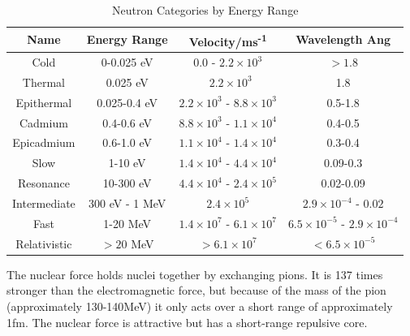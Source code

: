 \begin{table}[h]
\begin{center}
\renewcommand{\arraystretch}{1.2}
\begin{tabular}{c c c c}
\hline\hline
Name & Energy Range & Velocity/ms\textsuperscript{-1} & Wavelength Ang \\
\hline\hline
Cold & 0-0.025 eV & 0.0 - $2.2 \times 10^{3}$ &  $> 1.8$  \\
Thermal & 0.025 eV & ~$2.2 \times 10^{3}$ &  1.8  \\
Epithermal & 0.025-0.4 eV & $2.2 \times 10^{3}$ - $8.8 \times 10^{3}$ &  0.5-1.8 \\
Cadmium & 0.4-0.6 eV & $8.8 \times 10^{3}$ - $1.1 \times 10^4$ & 0.4-0.5  \\
Epicadmium & 0.6-1.0 eV & $1.1 \times 10^4$ - $1.4 \times 10^4$ & 0.3-0.4\\
Slow & 1-10 eV & $1.4 \times 10^4$ - $4.4 \times 10^4$   & 0.09-0.3\\
Resonance & 10-300 eV & $4.4 \times 10^4$ - $2.4 \times 10^5$ & 0.02-0.09\\
Intermediate & 300 eV - 1 MeV &  $2.4 \times 10^5$ & $2.9 \times 10^{-4}$ - $0.02$\\
Fast & 1-20 MeV & $1.4 \times 10^7$ - $6.1 \times 10^7$ & $6.5 \times 10^{-5}$ - $2.9 \times 10^{-4}$ \\
Relativistic & $>20$ MeV & $>6.1 \times 10^{7}$ & $< 6.5 \times 10^{-5}$\\
\hline\hline
\end{tabular}
\end{center}
\caption{Neutron Categories by Energy Range \cite{njcarron}}
\label{table:neutronenergies}
\end{table}

The nuclear force holds nuclei together by exchanging pions.  It is 137 times stronger than the electromagnetic force, but because of the mass of the pion (approximately 130-140MeV) it only acts over a short range of approximately 1fm.  The nuclear force is attractive but has a short-range repulsive core.


